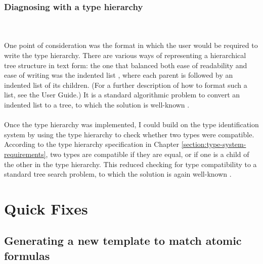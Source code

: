 \documentclass[../main.tex]{subfiles}
\begin{document}
{\subsubsection{Diagnosing with a type hierarchy}
\label{section:diagnosing-with-type-hierarchy}
\\
\\
One point of consideration was the format in which the user would be required to write the type hierarchy. There are various ways of representing a hierarchical tree structure in text form: the one that balanced both ease of readability and ease of writing was the indented list \cite{indented_list_to_tree}, where each parent is followed by an indented list of its children. (For a further description of how to format such a list, see the User Guide.) It is a standard algorithmic problem to convert an indented list to a tree, to which the solution is well-known \cite{indented_list_to_tree}. 
\\
\\
Once the type hierarchy was implemented, I could build on the type identification system by using the type hierarchy to check whether two types were compatible. According to the type hierarchy specification in Chapter \ref{section:type-system-requirements}, two types are compatible if they are equal, or if one is a child of the other in the type hierarchy. This reduced checking for type compatibility to a standard tree search problem, to which the solution is again well-known \cite{depth_first_search}.
%
%
%
\section{Quick Fixes}
\subsection{Generating a new template to match atomic formulas}
}
\end{document}
